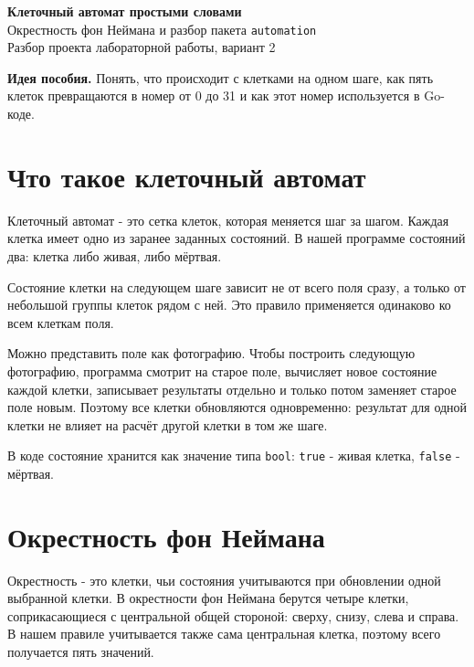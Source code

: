 \documentclass[12pt,a4paper]{article}
\newcommand{\code}[1]{\texttt{#1}}
\newcommand{\sectiontitle}[1]{\section{\color{ink}#1}}
\begin{document}
\begin{center}
  {\LARGE\bfseries\color{ink}Клеточный автомат простыми словами}\\[0.4em]
  {\large Окрестность фон Неймана и разбор пакета \code{automation}}\\[0.6em]
  {Разбор проекта лабораторной работы, вариант 2}
\end{center}

\vspace{0.5em}
\noindent\colorbox{softblue}{\parbox{\dimexpr\linewidth-2\fboxsep}{
  \textbf{Идея пособия.} Понять, что происходит с клетками на одном шаге,
  как пять клеток превращаются в номер от 0 до 31 и как этот номер
  используется в Go-коде.
}}

\sectiontitle{Что такое клеточный автомат}

Клеточный автомат - это сетка клеток, которая меняется шаг за шагом.
Каждая клетка имеет одно из заранее заданных состояний. В нашей программе
состояний два: клетка либо живая, либо мёртвая.

Состояние клетки на следующем шаге зависит не от всего поля сразу, а только
от небольшой группы клеток рядом с ней. Это правило применяется одинаково
ко всем клеткам поля.

Можно представить поле как фотографию. Чтобы построить следующую фотографию,
программа смотрит на старое поле, вычисляет новое состояние каждой клетки,
записывает результаты отдельно и только потом заменяет старое поле новым.
Поэтому все клетки обновляются одновременно: результат для одной клетки
не влияет на расчёт другой клетки в том же шаге.

В коде состояние хранится как значение типа \code{bool}:
\code{true} - живая клетка, \code{false} - мёртвая.

\sectiontitle{Окрестность фон Неймана}

Окрестность - это клетки, чьи состояния учитываются при обновлении одной
выбранной клетки. В окрестности фон Неймана берутся четыре клетки,
соприкасающиеся с центральной общей стороной: сверху, снизу, слева и справа.
В нашем правиле учитывается также сама центральная клетка, поэтому всего
получается пять значений.
\end{document}
